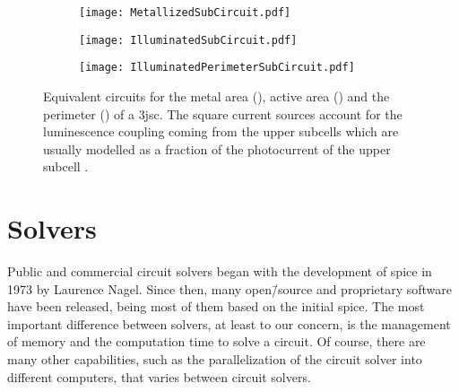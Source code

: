 \begin{figure}
	\hspace{0.025\textwidth}
	\begin{subfigure}[b]{0.3\textwidth}
        \centering       
        \texttt{[image: MetallizedSubCircuit.pdf]}
        \caption{}		
		\label{fig:AppA_MJCircuits_Met}
    \end{subfigure}
	\begin{subfigure}[b]{0.3\textwidth}
        \centering       
        \texttt{[image: IlluminatedSubCircuit.pdf]}
        \caption{}		
		\label{fig:AppA_MJCircuits_Ill}
    \end{subfigure}
    \begin{subfigure}[b]{0.3\textwidth}
        \centering      
        \texttt{[image: IlluminatedPerimeterSubCircuit.pdf]}
        \caption{}		
		\label{fig:AppA_MJCircuits_Per}  
    \end{subfigure}
	\caption[Equivalent circuits for the metal area, active area and the perimeter of a \gls{3jsc}.]{Equivalent circuits for the metal area (), active area () and the perimeter () of a \gls{3jsc}. The square current sources account for the luminescence coupling coming from the upper subcells which are usually modelled as a fraction of the photocurrent of the upper subcell \cite{Friedman2013a,Geisz2015}.}
    \label{fig:AppA_MJCircuits} 
\end{figure}

\section{Solvers}
Public and commercial circuit solvers began with the development of \gls{spice} in 1973 by Laurence Nagel. Since then, many open\=/source and proprietary software have been released, being most of them based on the initial \gls{spice}. The most important difference between solvers, at least to our concern, is the management of memory and the computation time to solve a circuit. Of course, there are many other capabilities, such as the parallelization of the circuit solver into different computers, that varies between circuit solvers.


